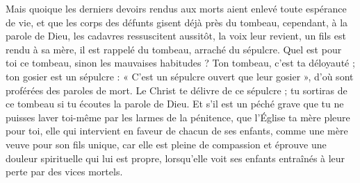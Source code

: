 Mais quoique les derniers devoirs rendus aux morts aient enlevé toute espérance de vie, et que les corps des défunts gisent déjà près du tombeau, cependant, à la parole de Dieu, les cadavres ressuscitent aussitôt, la voix leur revient, un fils est rendu à sa mère, il est rappelé du tombeau, arraché du sépulcre. Quel est pour toi ce tombeau, sinon les mauvaises habitudes ? Ton tombeau, c’est ta déloyauté ; ton gosier est un sépulcre : « C’est un sépulcre ouvert que leur gosier », d’où sont proférées des paroles de mort. Le Christ te délivre de ce sépulcre ; tu sortiras de ce tombeau si tu écoutes la parole de Dieu. Et s’il est un péché grave que tu ne puisses laver toi-même par les larmes de la pénitence, que l’Église ta mère pleure pour toi, elle qui intervient en faveur de chacun de ses enfants, comme une mère veuve pour son fils unique, car elle est pleine de compassion et éprouve une douleur spirituelle qui lui est propre, lorsqu’elle voit ses enfants entraînés à leur perte par des vices mortels.
